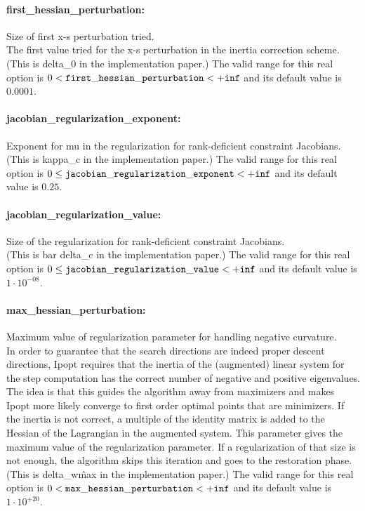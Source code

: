 \paragraph{first\_hessian\_perturbation:}\label{sec:first_hessian_perturbation} Size of first x-s perturbation tried. $\;$ \\
 The first value tried for the x-s perturbation in
the inertia correction scheme.(This is delta\_0
in the implementation paper.) The valid range for this real option is 
$0 <  {\tt first\_hessian\_perturbation } <  {\tt +inf}$
and its default value is $0.0001$.


\paragraph{jacobian\_regularization\_exponent:}\label{sec:jacobian_regularization_exponent} Exponent for mu in the regularization for rank-deficient constraint Jacobians. $\;$ \\
 (This is kappa\_c in the implementation paper.) The valid range for this real option is 
$0 \le {\tt jacobian\_regularization\_exponent } <  {\tt +inf}$
and its default value is $0.25$.


\paragraph{jacobian\_regularization\_value:}\label{sec:jacobian_regularization_value} Size of the regularization for rank-deficient constraint Jacobians. $\;$ \\
 (This is bar delta\_c in the implementation
paper.) The valid range for this real option is 
$0 \le {\tt jacobian\_regularization\_value } <  {\tt +inf}$
and its default value is $1 \cdot 10^{-08}$.


\paragraph{max\_hessian\_perturbation:}\label{sec:max_hessian_perturbation} Maximum value of regularization parameter for handling negative curvature. $\;$ \\
 In order to guarantee that the search directions
are indeed proper descent directions, Ipopt
requires that the inertia of the (augmented)
linear system for the step computation has the
correct number of negative and positive
eigenvalues. The idea is that this guides the
algorithm away from maximizers and makes Ipopt
more likely converge to first order optimal
points that are minimizers. If the inertia is not
correct, a multiple of the identity matrix is
added to the Hessian of the Lagrangian in the
augmented system. This parameter gives the
maximum value of the regularization parameter. If
a regularization of that size is not enough, the
algorithm skips this iteration and goes to the
restoration phase. (This is delta\_w\^max in the
implementation paper.) The valid range for this real option is 
$0 <  {\tt max\_hessian\_perturbation } <  {\tt +inf}$
and its default value is $1 \cdot 10^{+20}$.


